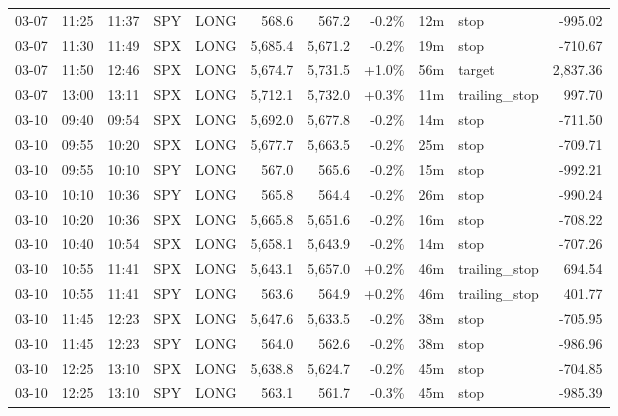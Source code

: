 \documentclass[11pt,a4paper,twoside]{article}
\begin{document}
\begin{center}
\begin{longtable}{>{\color{txtmain}}l l l l l r r r r >{\color{txtmain}}l r}
03-07 & 11:25 & 11:37 & SPY & LONG & 568.6 & 567.2 & \textcolor{lossred}{-0.2\%} & 12m & stop & \textcolor{lossred}{-995.02} \\
03-07 & 11:30 & 11:49 & SPX & LONG & 5,685.4 & 5,671.2 & \textcolor{lossred}{-0.2\%} & 19m & stop & \textcolor{lossred}{-710.67} \\
03-07 & 11:50 & 12:46 & SPX & LONG & 5,674.7 & 5,731.5 & \textcolor{wingreen}{+1.0\%} & 56m & target & \textcolor{wingreen}{2,837.36} \\
03-07 & 13:00 & 13:11 & SPX & LONG & 5,712.1 & 5,732.0 & \textcolor{wingreen}{+0.3\%} & 11m & trailing\_stop & \textcolor{wingreen}{997.70} \\
03-10 & 09:40 & 09:54 & SPX & LONG & 5,692.0 & 5,677.8 & \textcolor{lossred}{-0.2\%} & 14m & stop & \textcolor{lossred}{-711.50} \\
03-10 & 09:55 & 10:20 & SPX & LONG & 5,677.7 & 5,663.5 & \textcolor{lossred}{-0.2\%} & 25m & stop & \textcolor{lossred}{-709.71} \\
03-10 & 09:55 & 10:10 & SPY & LONG & 567.0 & 565.6 & \textcolor{lossred}{-0.2\%} & 15m & stop & \textcolor{lossred}{-992.21} \\
03-10 & 10:10 & 10:36 & SPY & LONG & 565.8 & 564.4 & \textcolor{lossred}{-0.2\%} & 26m & stop & \textcolor{lossred}{-990.24} \\
03-10 & 10:20 & 10:36 & SPX & LONG & 5,665.8 & 5,651.6 & \textcolor{lossred}{-0.2\%} & 16m & stop & \textcolor{lossred}{-708.22} \\
03-10 & 10:40 & 10:54 & SPX & LONG & 5,658.1 & 5,643.9 & \textcolor{lossred}{-0.2\%} & 14m & stop & \textcolor{lossred}{-707.26} \\
03-10 & 10:55 & 11:41 & SPX & LONG & 5,643.1 & 5,657.0 & \textcolor{wingreen}{+0.2\%} & 46m & trailing\_stop & \textcolor{wingreen}{694.54} \\
03-10 & 10:55 & 11:41 & SPY & LONG & 563.6 & 564.9 & \textcolor{wingreen}{+0.2\%} & 46m & trailing\_stop & \textcolor{wingreen}{401.77} \\
03-10 & 11:45 & 12:23 & SPX & LONG & 5,647.6 & 5,633.5 & \textcolor{lossred}{-0.2\%} & 38m & stop & \textcolor{lossred}{-705.95} \\
03-10 & 11:45 & 12:23 & SPY & LONG & 564.0 & 562.6 & \textcolor{lossred}{-0.2\%} & 38m & stop & \textcolor{lossred}{-986.96} \\
03-10 & 12:25 & 13:10 & SPX & LONG & 5,638.8 & 5,624.7 & \textcolor{lossred}{-0.2\%} & 45m & stop & \textcolor{lossred}{-704.85} \\
03-10 & 12:25 & 13:10 & SPY & LONG & 563.1 & 561.7 & \textcolor{lossred}{-0.3\%} & 45m & stop & \textcolor{lossred}{-985.39} \\

\end{longtable}
\end{center}
\end{document}
